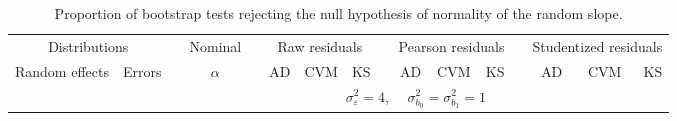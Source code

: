 \begin{table}[ht]
\begin{scriptsize}
\begin{tabular}{ll p{.1cm} c p{.1cm} rrr p{.1cm} rrr p{.1cm} rrr}
   \hline
\end{tabular}
\end{scriptsize}
\end{table}


\begin{table}[ht]
\centering
\caption{\label{tab:bootb1} Proportion of bootstrap tests rejecting the null hypothesis of normality of the random slope.}
\begin{scriptsize}
\begin{tabular}{ll p{.1cm} c p{.1cm} rrr p{.1cm} rrr p{.1cm} rrr}
  \hline
  \multicolumn{2}{c}{Distributions}& & Nominal & &  \multicolumn{3}{c}{Raw residuals} & & \multicolumn{3}{c}{Pearson residuals} & & \multicolumn{3}{c}{Studentized residuals}\\ \cline{1-2} \cline{6-8} \cline{10-12} \cline{14-16}
  Random effects & Errors & & $\alpha$ & & AD & CVM & KS & & AD & CVM & KS & & AD & CVM & KS \\ 
   \hline
& && && \multicolumn{9}{c}{$\sigma_{\varepsilon}^2 = 4$, \ \ $\sigma_{b_0}^2 = \sigma_{b_1}^2 = 1$} \\ \cline{6-16}


\end{tabular}
\end{scriptsize}
\end{table}
